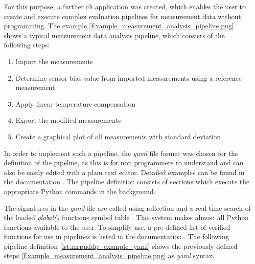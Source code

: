 For this purpose, a further \gls{cli} application was created, which
enables the user to create and execute complex evaluation pipelines for
measurement data without programming. The example
\ref{Example_measurement_analysis_pipeline.png} shows a typical
measurement data analysis pipeline, which consists of the following
steps:

\begin{enumerate}
\def\labelenumi{\arabic{enumi}.}
\tightlist
\item
  Import the measurements
\item
  Determine sensor bias value from imported measurements using a
  reference measurement
\item
  Apply linear temperature compensation
\item
  Export the modified measurements
\item
  Create a graphical plot of all measurements with standard deviation
\end{enumerate}

In order to implement such a pipeline, the \emph{yaml} file format was
chosen for the definition of the pipeline, as this is for non
programmers to understand and can also be easily edited with a plain
text editor. Detailed examples can be found in the documentation
\cite{MagneticReadoutProcessingReadTheDocs}. The pipeline definition
consists of sections which execute the appropriate Python commands in
the background.

The signatures in the \emph{yaml} file are called using reflection and a
real-time search of the loaded \emph{global()} functions symbol table
\cite{PythonGlobalSymbolTable}. This system makes almost all Python
functions available to the user. To simplify use, a pre-defined list of
verified functions for use in pipelines is listed in the documentation
\cite{MagneticReadoutProcessingReadTheDocs}. The following pipeline
definition \ref{lst:mrpuddp_example_yaml} shows the previously defined
steps \ref{Example_measurement_analysis_pipeline.png} as \emph{yaml}
syntax.

